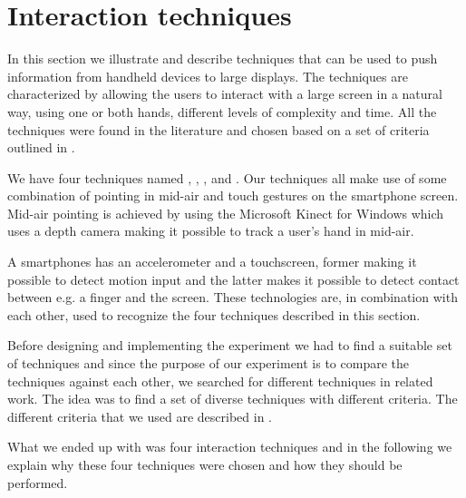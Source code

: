 \section{Interaction techniques} \label{sec:techniques}
In this section we illustrate and describe techniques that can be used to push information from handheld devices to large displays.
The techniques are characterized by allowing the users to interact with a large screen in a natural way, using one or both hands, different levels of complexity and time.
All the techniques were found in the literature and chosen based on a set of criteria outlined in .




We have four techniques named \swipe, \tilt, \throw, and \pinch.
Our techniques all make use of some combination of pointing in mid-air and touch gestures on the smartphone screen.
Mid-air pointing is achieved by using the Microsoft Kinect for Windows which uses a depth camera making it possible to track a user's hand in mid-air.

A smartphones has an accelerometer and a touchscreen, former making it possible to detect motion input and the latter makes it possible to detect contact between e.g. a finger and the screen.
These technologies are, in combination with each other, used to recognize the four techniques described in this section. 

Before designing and implementing the experiment we had to find a suitable set of techniques and since the purpose of our experiment is to compare the techniques against each other, we searched for different techniques in related work.
The idea was to find a set of diverse techniques with different criteria.
The different criteria that we used are described in .

What we ended up with was four interaction techniques and in the following we explain why these four techniques were chosen and how they should be performed.

